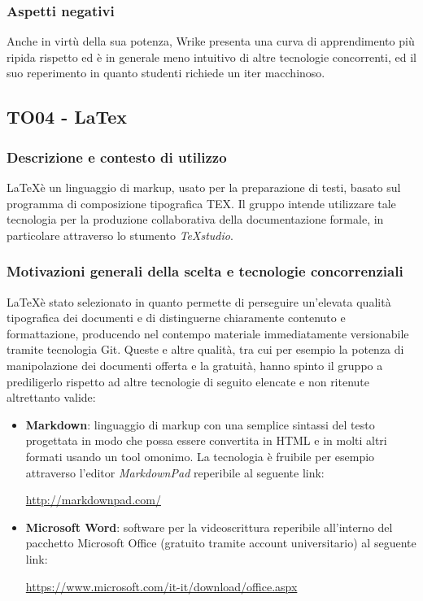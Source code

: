 \documentclass[./../Technology Baseline.tex]{subfiles}
\begin{document}
\subsubsection{Aspetti negativi}
Anche in virtù della sua potenza, Wrike presenta una curva di apprendimento più ripida rispetto ed è in generale meno intuitivo di altre tecnologie concorrenti, ed il suo reperimento in quanto studenti richiede un iter macchinoso.

\subsection{TO04 - LaTex}

\subsubsection{Descrizione e contesto di utilizzo}
\LaTeX è un linguaggio di markup, usato per la preparazione di testi, basato sul programma di composizione tipografica TEX. Il gruppo intende utilizzare tale tecnologia per la produzione collaborativa della documentazione formale, in particolare attraverso lo stumento \textit{TeXstudio}.

\subsubsection{Motivazioni generali della scelta e tecnologie concorrenziali}
\LaTeX è stato selezionato in quanto permette di perseguire un'elevata qualità tipografica dei documenti e di distinguerne chiaramente contenuto e formattazione, producendo nel contempo materiale immediatamente versionabile tramite tecnologia Git. Queste e altre qualità, tra cui per esempio la potenza di manipolazione dei documenti offerta e la gratuità, hanno spinto il gruppo a prediligerlo rispetto ad altre tecnologie di seguito elencate e non ritenute altrettanto valide:
\begin{itemize}
	\item \textbf{Markdown}: linguaggio di markup con una semplice sintassi del testo progettata in modo che possa essere convertita in HTML e in molti altri formati usando un tool omonimo. La tecnologia è fruibile per esempio attraverso l'editor \textit{MarkdownPad} reperibile al seguente link:
	\begin{center}
		\url{http://markdownpad.com/}
	\end{center}

	\item \textbf{Microsoft Word}: software per la videoscrittura reperibile all'interno del pacchetto Microsoft Office (gratuito tramite account universitario) al seguente link:
	\begin{center}
		\url{https://www.microsoft.com/it-it/download/office.aspx}
	\end{center} 
\end{itemize}  
\end{document}
